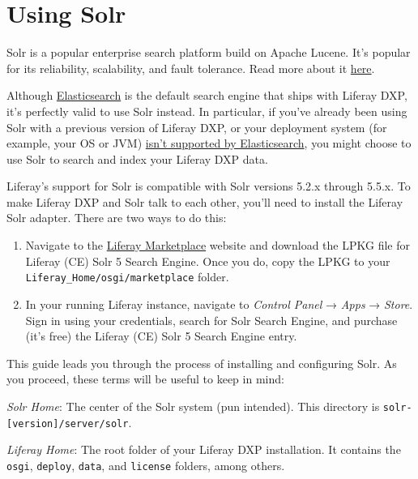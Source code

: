 \section{Using Solr}\label{using-solr}

Solr is a popular enterprise search platform build on Apache Lucene.
It's popular for its reliability, scalability, and fault tolerance. Read
more about it \href{http://lucene.apache.org/solr/}{here}.

Although
\href{/docs/7-0/deploy/-/knowledge_base/d/configuring-elasticsearch-for-liferay-0}{Elasticsearch}
is the default search engine that ships with Liferay DXP, it's perfectly
valid to use Solr instead. In particular, if you've already been using
Solr with a previous version of Liferay DXP, or your deployment system
(for example, your OS or JVM)
\href{https://www.elastic.co/support/matrix}{isn't supported by
Elasticsearch}, you might choose to use Solr to search and index your
Liferay DXP data.

Liferay's support for Solr is compatible with Solr versions 5.2.x
through 5.5.x. To make Liferay DXP and Solr talk to each other, you'll
need to install the Liferay Solr adapter. There are two ways to do this:

\begin{enumerate}
\def\labelenumi{\arabic{enumi}.}
\item
  Navigate to the \href{https://web.liferay.com/marketplace/}{Liferay
  Marketplace} website and download the LPKG file for Liferay (CE) Solr
  5 Search Engine. Once you do, copy the LPKG to your
  \texttt{Liferay\_Home/osgi/marketplace} folder.
\item
  In your running Liferay instance, navigate to \emph{Control Panel} →
  \emph{Apps} → \emph{Store}. Sign in using your credentials, search for
  Solr Search Engine, and purchase (it's free) the Liferay (CE) Solr 5
  Search Engine entry.
\end{enumerate}

This guide leads you through the process of installing and configuring
Solr. As you proceed, these terms will be useful to keep in mind:

\emph{Solr Home}: The center of the Solr system (pun intended). This
directory is \texttt{solr-{[}version{]}/server/solr}.

\emph{Liferay Home}: The root folder of your Liferay DXP installation.
It contains the \texttt{osgi}, \texttt{deploy}, \texttt{data}, and
\texttt{license} folders, among others.

